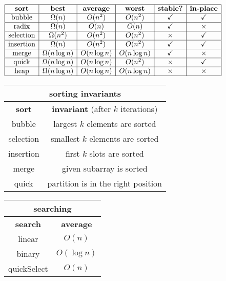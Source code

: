 \documentclass{article}
\newenvironment{tightcenter}{%
  \setlength\topsep{0pt}
  \setlength\parskip{0pt}
  \begin{center}
}{%
  \end{center}
}
\begin{document}
\begin{multicols}{2}
    \begin{tightcenter}
        $
            \begin{array}{| c | c | c | c | c | c |}
                \hline\textbf{sort} & \textbf{best} & \textbf{average} & \textbf{worst} & \textbf{stable?} & \textbf{in-place}

                \\\hline\text{bubble} & \Omega(n) & O(n^2) & O(n^2) & \checkmark & \checkmark
                \\\hline\text{radix} & \Omega(n) & O(n) & O(n) & \checkmark & \times

                \\\hline\text{selection} & \Omega(n^2) & O(n^2) & O(n^2) & \times & \checkmark

                \\\hline\text{insertion} & \Omega(n) & O(n^2) & O(n^2) & \checkmark & \checkmark

                \\\hline\text{merge} & \Omega(n\log n) & O(n\log n) & O(n\log n) & \checkmark & \times

                \\\hline\text{quick} & \Omega(n\log n) & O(n\log n) & O(n^2) & \times & \checkmark
                \\\hline\text{heap} & \Omega(n\log n) & O(n\log n) & O(n\log n) & \times & \times
                \\\hline
            \end{array}
        $\
        \begin{tabular}{| c | c |}
            \multicolumn{2}{c}{sorting invariants}
            \\\hline\textbf{sort} & \textbf{invariant} (after $k$ iterations)
            \\\hline bubble & largest $k$ elements are sorted
            \\\hline selection & smallest $k$ elements are sorted
            \\\hline insertion & first $k$ slots are sorted
            \\\hline merge & given subarray is sorted
            \\\hline quick & partition is in the right position
            \\\hline
        \end{tabular} \begin{tabular}{| c | c |}
            \multicolumn{2}{c}{searching}      \\\hline
            \textbf{search} & \textbf{average} \\\hline
            linear          & $O(n)$           \\\hline
            binary          & $O(\log n)$      \\\hline
            quickSelect     & $O(n)$           \\\hline
        \end{tabular}


\end{tightcenter}
\end{multicols}
\end{document}
